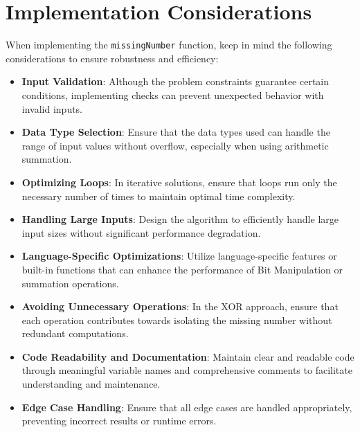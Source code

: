 \section*{Implementation Considerations}

When implementing the \texttt{missingNumber} function, keep in mind the following considerations to ensure robustness and efficiency:

\begin{itemize}
    \item \textbf{Input Validation}: Although the problem constraints guarantee certain conditions, implementing checks can prevent unexpected behavior with invalid inputs.
    
    \item \textbf{Data Type Selection}: Ensure that the data types used can handle the range of input values without overflow, especially when using arithmetic summation.
    
    \item \textbf{Optimizing Loops}: In iterative solutions, ensure that loops run only the necessary number of times to maintain optimal time complexity.
    
    \item \textbf{Handling Large Inputs}: Design the algorithm to efficiently handle large input sizes without significant performance degradation.
    
    \item \textbf{Language-Specific Optimizations}: Utilize language-specific features or built-in functions that can enhance the performance of Bit Manipulation or summation operations.
    
    \item \textbf{Avoiding Unnecessary Operations}: In the XOR approach, ensure that each operation contributes towards isolating the missing number without redundant computations.
    
    \item \textbf{Code Readability and Documentation}: Maintain clear and readable code through meaningful variable names and comprehensive comments to facilitate understanding and maintenance.
    
    \item \textbf{Edge Case Handling}: Ensure that all edge cases are handled appropriately, preventing incorrect results or runtime errors.
    

\end{itemize}
